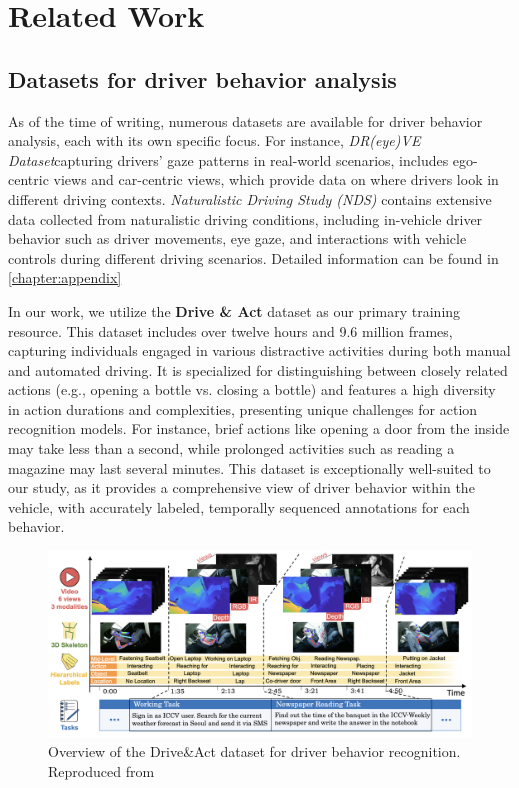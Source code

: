 \chapter{Related Work}\label{chapter:relatedwork}

\section{Datasets for driver behavior analysis}

As of the time of writing, numerous datasets are available for driver behavior analysis, each with its own specific focus. For instance, \textit{DR(eye)VE Dataset}\cite{palazzi2018predicting}capturing drivers' gaze patterns in real-world scenarios, includes ego-centric views and car-centric views, which provide data on where drivers look in different driving contexts. \textit{Naturalistic Driving Study (NDS)}\cite{regan2012naturalistic} contains extensive data collected from naturalistic driving conditions, including in-vehicle driver behavior such as driver movements, eye gaze, and interactions with vehicle controls during different driving scenarios. Detailed information can be found in \ref{chapter:appendix}


In our work, we utilize the \textbf{Drive \& Act} dataset\cite{9009583} as our primary training resource. This dataset includes over twelve hours and 9.6 million frames, capturing individuals engaged in various distractive activities during both manual and automated driving. It is specialized for distinguishing between closely related actions (e.g., opening a bottle vs. closing a bottle) and features a high diversity in action durations and complexities, presenting unique challenges for action recognition models. For instance, brief actions like opening a door from the inside may take less than a second, while prolonged activities such as reading a magazine may last several minutes. This dataset is exceptionally well-suited to our study, as it provides a comprehensive view of driver behavior within the vehicle, with accurately labeled, temporally sequenced annotations for each behavior.


\begin{figure}
    \centering
    \includegraphics[width=0.8\linewidth]{figures/03_DriveAct.png}
    \caption{Overview of the Drive\&Act dataset for driver behavior recognition. Reproduced from\cite{9009583}}
    \label{fig:DriveAct}
\end{figure}


